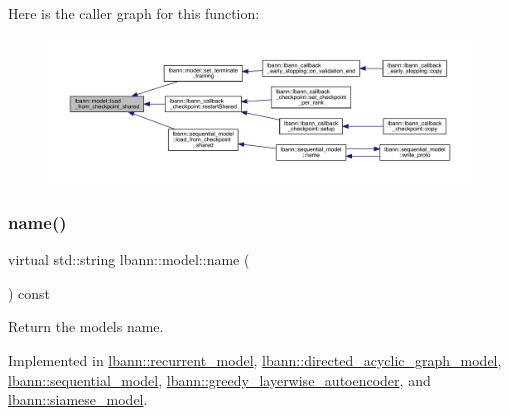 Here is the caller graph for this function\+:\nopagebreak
\begin{figure}[H]
\begin{center}
\leavevmode
\includegraphics[width=350pt]{classlbann_1_1model_a2e02dda11636e015ea0c892ffa541881_icgraph}
\end{center}
\end{figure}
\mbox{\label{classlbann_1_1model_a7e471599eded909c4ce7178689dd13b6}} 
\subsubsection{\texorpdfstring{name()}{name()}}
{\footnotesize\ttfamily virtual std\+::string lbann\+::model\+::name (\begin{DoxyParamCaption}{ }\end{DoxyParamCaption}) const\hspace{0.3cm}{\ttfamily [pure virtual]}}

Return the model\textquotesingle{}s name. 

Implemented in \hyperlink{classlbann_1_1recurrent__model_a01b4f6dce63bc2e0545b2bd7603b32b2}{lbann\+::recurrent\+\_\+model}, \hyperlink{classlbann_1_1directed__acyclic__graph__model_ad2b97ab2670e76538a754e28e19b5c94}{lbann\+::directed\+\_\+acyclic\+\_\+graph\+\_\+model}, \hyperlink{classlbann_1_1sequential__model_abf2b69dacb5ee3165289377e1d961cd5}{lbann\+::sequential\+\_\+model}, \hyperlink{classlbann_1_1greedy__layerwise__autoencoder_a975ea739b9a97e76fac46ce8191dea84}{lbann\+::greedy\+\_\+layerwise\+\_\+autoencoder}, and \hyperlink{classlbann_1_1siamese__model_ad745961977aa395e11543d263103126e}{lbann\+::siamese\+\_\+model}.

\mbox{\label{classlbann_1_1model_a05e8bd6c745ce4414be98462147ec52e}} 
